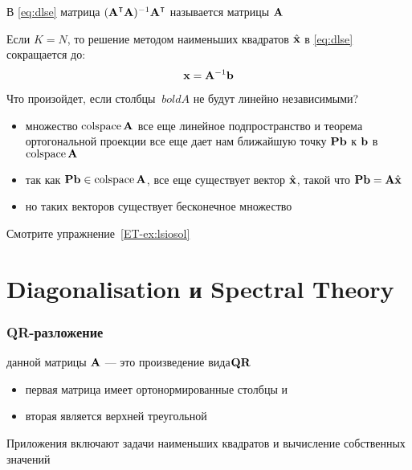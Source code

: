 \begin{frame}

    \vspace{2em}
    В \eqref{eq:dlse} матрица $(\boldA^\T\boldA)^{-1} \boldA^\T$ 
    называется  матрицы $\mathbf A$ 
    
    \vspace{1em}
    Если $K =
    N$, то
    решение методом наименьших квадратов $\hat {\mathbf x}$ в \eqref{eq:dlse} сокращается до:
    \begin{equation*}
        {\mathbf x} = \mathbf A^{-1}{\mathbf b}
    \end{equation*}
    
\end{frame}

\begin{frame}

     \vspace{2em}
    Что произойдет, если столбцы $ \ boldA $ не будут
    линейно независимыми? 
    
    \begin{itemize}
        \item   множество $\operatorname{colspace} \mathbf A$ все еще линейное
        подпространство и теорема ортогональной проекции все еще дает нам ближайшую
        точку $\mathbf P {\mathbf b}$ к ${\mathbf b}$ в $\operatorname{colspace} \mathbf A$
        \item   так как $\mathbf P
        {\mathbf b} \in \operatorname{colspace} \mathbf A$, все еще существует вектор $\hat {\mathbf x}$, такой что
        $\mathbf P {\mathbf b} = \mathbf A \hat {\mathbf x}$
        \item   но таких векторов существует бесконечное множество
    \end{itemize}
    
    Смотрите упражнение~\ref{ET-ex:lsiosol}
    
\end{frame}


\section{Diagonalisation и Spectral Theory} 

\begin{frame}\frametitle{QR-разложение}

     \vspace{2em}
     данной матрицы $\mathbf A$ --- это произведение вида$\mathbf Q \mathbf R$
    \begin{itemize}
        \item первая матрица имеет ортонормированные столбцы и 
        \item вторая является верхней треугольной
    \end{itemize}
    
    \vspace{1em}
    Приложения включают задачи наименьших квадратов и вычисление собственных значений
    
\end{frame}

